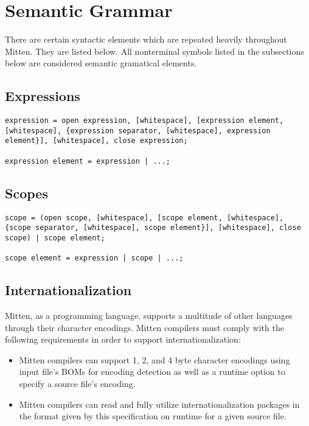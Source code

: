 \documentclass[10pt,a4paper]{article}
\begin{document}
\section{Semantic Grammar}
There are certain syntactic elements which are repeated heavily throughout Mitten. They are listed below. All nonterminal symbols listed in the subsections below are considered semantic gramatical elements.

\subsection{Expressions}
\begin{verbatim}
expression = open expression, [whitespace], [expression element, [whitespace], {expression separator, [whitespace], expression element}], [whitespace], close expression;

expression element = expression | ...;
\end{verbatim}

\subsection{Scopes}
\begin{verbatim}
scope = (open scope, [whitespace], [scope element, [whitespace], {scope separator, [whitespace], scope element}], [whitespace], close scope) | scope element;

scope element = expression | scope | ...;
\end{verbatim}

\subsection{Internationalization}
\label{sec:Internationalization}
Mitten, as a programming language, supports a multitude of other languages through their character encodings. Mitten compilers must comply with the following requirements in order to support internationalization:
\begin{itemize}
\item Mitten compilers can support 1, 2, and 4 byte character encodings using input file's BOMs for encoding detection as well as a runtime option to specify a source file's encoding.
\item Mitten compilers can read and fully utilize internationalization packages in the format given by this specification on runtime for a given source file.
\end{itemize}
\end{document}
